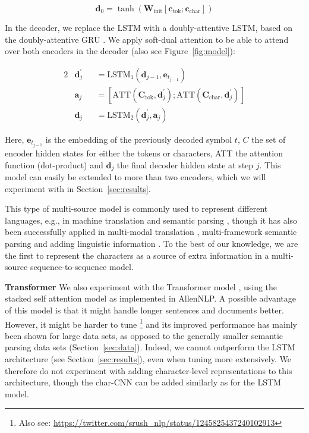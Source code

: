 \documentclass[11pt,a4paper]{article}
\newcommand{\vect}[1]{\mathbf{#1}}
\newcommand{\matr}[1]{\mathbf{#1}}
\newcommand{\inlineheader}[1]{\vspace{0.06cm}
\noindent\textbf{#1}\quad
}
\begin{document}
\begin{equation*}
    \vect{d}_0 = \tanh \left( \matr{W}_\mathrm{init} \left[ \vect{c}_\mathrm{tok}; \vect{c}_\mathrm{char} \right] \right)
\end{equation*}


In the decoder, we replace the LSTM with a doubly-attentive LSTM, based on the doubly-attentive GRU \citep{calixto-etal-2017-doubly}. We apply soft-dual attention \citep{junczys-dowmunt-grundkiewicz-2017-exploration} to be able to attend over both encoders in the decoder (also see Figure~\ref{fig:model}):


\vspace{-0.4cm}
\begin{alignat*}{2}
    &\vect{d}_j^{\prime} &&= \text{LSTM}_1 \left( \vect{d}_{j-1}, \vect{e}_{t_{j-1}}  \right) \\
    &\vect{a}_j &&= \left[ \text{ATT}\left( \matr{C}_\mathrm{tok},\vect{d}_j^{\prime}   \right); \text{ATT}\left( \matr{C}_\mathrm{char},\vect{d}_j^{\prime}   \right) \right] \\
    &\vect{d}_j &&= \text{LSTM}_2 \left( \vect{d}^{\prime}_j, \vect{a}_j   \right)
\end{alignat*}
\vspace{-0.4cm}

Here, $\vect{e}_{t_{j-1}}$ is the embedding of the previously decoded symbol $t$,  $C$ the set of encoder hidden states for either the tokens or characters, ATT the attention function (dot-product) and $\vect{d}_j$ the final decoder hidden state at step $j$. This model can easily be extended to more than two encoders, which we will experiment with in Section~\ref{sec:results}.

This type of multi-source model is commonly used to represent different languages, e.g., in machine translation \citep{zoph:16,firat-etal-2016-multi} and semantic parsing \citep{susanto2017neural, duong2017multilingual}, though it has also been successfully applied in multi-modal translation \citep{libovicky-helcl-2017-attention}, multi-framework semantic parsing \citep{stanovsky-dagan-2018-semantics} and adding linguistic information \citep{currey:18, van-noord-etal-2019-linguistic}. To the best of our knowledge, we are the first to represent the characters as a source of extra information in a multi-source sequence-to-sequence model.

\inlineheader{Transformer} We also experiment with the Transformer model \citep{transformer:17}, using the stacked self attention model as implemented in AllenNLP. A possible advantage of this model is that it might handle longer sentences and documents better. However, it might be harder to tune \citep{popel2018training}\footnote{Also see: \url{https://twitter.com/srush_nlp/status/1245825437240102913}} and its improved performance has mainly been shown for large data sets, as opposed to the generally smaller semantic parsing data sets (Section~\ref{sec:data}). Indeed, we cannot outperform the LSTM architecture (see Section~\ref{sec:results}), even when tuning more extensively. We therefore do not experiment with adding character-level representations to this architecture, though the char-CNN can be added similarly as for the LSTM model.
\end{document}
